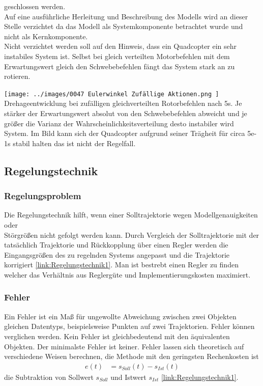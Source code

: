 geschlossen werden.\\
Auf eine ausführliche Herleitung und Beschreibung des Modells wird an dieser Stelle verzichtet da das Modell als Systemkomponente betrachtet wurde und nicht als Kernkomponente.\\
Nicht verzichtet werden soll auf den Hinweis, dass ein Quadcopter ein sehr instabiles System ist. Selbst bei gleich verteilten Motorbefehlen mit dem Erwartungswert gleich den Schwebebefehlen fängt das System stark an zu rotieren.
\begin{center}
	\texttt{[image: ../images/0047 Eulerwinkel Zufällige Aktionen.png
	]}{\\Drehageentwicklung bei zufälligen gleichverteilten Rotorbefehlen nach 5s. Je stärker der Erwartungswert absolut von den Schwebebefehlen abweicht und je größer die Varianz der Wahrscheinlichkeitsverteilung desto instabiler wird System. Im Bild kann sich der Quadcopter aufgrund seiner Trägheit für circa 5e-1s stabil halten das ist nicht der Regelfall.}
\end{center}



\subsection{Regelungstechnik}

\subsubsection{Regelungsproblem}
Die Regelungstechnik hilft, wenn einer Solltrajektorie wegen Modellgenauigkeiten oder\\ Störgrößen nicht gefolgt werden kann. Durch Vergleich der Solltrajektorie mit der tatsächlich Trajektorie und Rückkopplung über einen Regler werden die Eingangsgrößen des zu regelnden Systems angepasst und die Trajektorie korrigiert \ref{link:Regelungstechnik1}. Man ist bestrebt einen Regler zu finden welcher das Verhältnis aus Reglergüte und Implementierungskosten maximiert.

\subsubsection{Fehler}
Ein Fehler ist ein Maß für ungewollte Abweichung zwischen zwei Objekten gleichen Datentyps, beispielsweise Punkten auf zwei Trajektorien. Fehler können verglichen werden. Kein Fehler ist gleichbedeutend mit den äquivalenten Objekten. Der minimalste Fehler ist keiner. Fehler lassen sich theoretisch auf verschiedene Weisen berechnen, die Methode mit den geringsten Rechenkosten ist 
\begin{align}
	e(t) &= s_{Soll}(t) - s_{Ist}(t)
\end{align}
die Subtraktion von Sollwert $s_{Soll}$ und Istwert $s_{Ist}$ \ref{link:Regelungstechnik1}.

